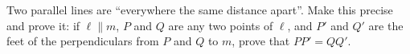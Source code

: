 Two parallel lines are ``everywhere the same distance apart''. Make this precise and prove it: if $\ell\parallel m$, $P$ and $Q$ are any two points of $\ell$, and $P'$ and $Q'$ are the feet of the perpendiculars from $P$ and $Q$ to $m$, prove that $PP'=QQ'$.
